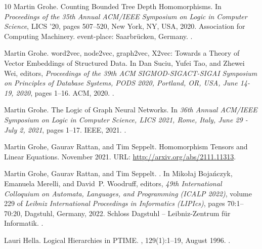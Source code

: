 \documentclass[10pt,a4paper]{article}
\begin{document}
\begin{thebibliography}{10}
Martin Grohe.
\newblock Counting {Bounded} {Tree} {Depth} {Homomorphisms}.
\newblock In {\em Proceedings of the 35th {Annual} {ACM}/{IEEE} {Symposium} on
  {Logic} in {Computer} {Science}}, {LICS} '20, pages 507--520, New York, NY,
  USA, 2020. Association for Computing Machinery.
\newblock event-place: Saarbr{\"u}cken, Germany.
\newblock \href {https://doi.org/10.1145/3373718.3394739}
  {}.

Martin Grohe.
\newblock word2vec, node2vec, graph2vec, {X2vec}: {Towards} a {Theory} of
  {Vector} {Embeddings} of {Structured} {Data}.
\newblock In Dan Suciu, Yufei Tao, and Zhewei Wei, editors, {\em Proceedings of
  the 39th {ACM} {SIGMOD}-{SIGACT}-{SIGAI} {Symposium} on {Principles} of
  {Database} {Systems}, {PODS} 2020, {Portland}, {OR}, {USA}, {June} 14-19,
  2020}, pages 1--16. ACM, 2020.
\newblock \href {https://doi.org/10.1145/3375395.3387641}
  {}.

Martin Grohe.
\newblock The {Logic} of {Graph} {Neural} {Networks}.
\newblock In {\em 36th {Annual} {ACM}/{IEEE} {Symposium} on {Logic} in
  {Computer} {Science}, {LICS} 2021, {Rome}, {Italy}, {June} 29 - {July} 2,
  2021}, pages 1--17. IEEE, 2021.
\newblock \href {https://doi.org/10.1109/LICS52264.2021.9470677}
  {}.

Martin Grohe, Gaurav Rattan, and Tim Seppelt.
\newblock Homomorphism {Tensors} and {Linear} {Equations}.
\newblock November 2021.
\newblock URL: \url{http://arxiv.org/abs/2111.11313}.

Martin Grohe, Gaurav Rattan, and Tim Seppelt.
.
\newblock In Miko{\l}aj Boja\'{n}czyk, Emanuela Merelli, and David~P. Woodruff,
  editors, {\em 49th International Colloquium on Automata, Languages, and
  Programming (ICALP 2022)}, volume 229 of {\em Leibniz International
  Proceedings in Informatics (LIPIcs)}, pages 70:1--70:20, Dagstuhl, Germany,
  2022. Schloss Dagstuhl -- Leibniz-Zentrum f{\"u}r Informatik.
\newblock \href {https://doi.org/10.4230/LIPIcs.ICALP.2022.70}
  {}.

Lauri Hella.
\newblock Logical {Hierarchies} in {PTIME}.
, 129(1):1--19, August 1996.
\newblock \href {https://doi.org/10.1006/inco.1996.0070}
  {}.


\end{thebibliography}
\end{document}

